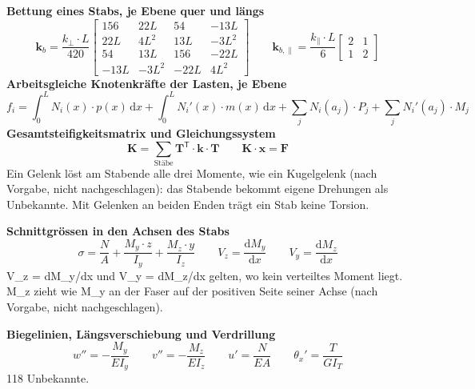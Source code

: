 \documentclass[11pt,a4paper]{article}
\begin{document}
\noindent\textbf{Bettung eines Stabs, je Ebene quer und längs}
\begin{equation*}
\mathbf{k}_{b} = \frac{k_{\perp} \cdot L}{420} \begin{bmatrix} 156 & 22L & 54 & -13L \\ 22L & 4L^2 & 13L & -3L^2 \\ 54 & 13L & 156 & -22L \\ -13L & -3L^2 & -22L & 4L^2 \end{bmatrix} \qquad \mathbf{k}_{b,\parallel} = \frac{k_{\parallel} \cdot L}{6} \begin{bmatrix} 2 & 1 \\ 1 & 2 \end{bmatrix}
\end{equation*}
\noindent\textbf{Arbeitsgleiche Knotenkräfte der Lasten, je Ebene}
\begin{equation*}
f_i = \int_0^L N_i(x) \cdot p(x)\,\mathrm{d}x + \int_0^L N_i'(x) \cdot m(x)\,\mathrm{d}x + \sum_j N_i(a_j) \cdot P_j + \sum_j N_i'(a_j) \cdot M_j
\end{equation*}
\noindent\textbf{Gesamtsteifigkeitsmatrix und Gleichungssystem}
\begin{equation*}
\mathbf{K} = \sum_{\text{Stäbe}} \mathbf{T}^{\mathsf{T}} \cdot \mathbf{k} \cdot \mathbf{T} \qquad \mathbf{K} \cdot \mathbf{x} = \mathbf{F}
\end{equation*}
Ein Gelenk löst am Stabende alle drei Momente, wie ein Kugelgelenk (nach Vorgabe, nicht nachgeschlagen): das Stabende bekommt eigene Drehungen als Unbekannte. Mit Gelenken an beiden Enden trägt ein Stab keine Torsion.

\noindent\textbf{Schnittgrössen in den Achsen des Stabs}
\begin{equation*}
\sigma = \frac{N}{A} + \frac{M_y \cdot z}{I_y} + \frac{M_z \cdot y}{I_z} \qquad V_z = \frac{\mathrm{d}M_y}{\mathrm{d}x} \qquad V_y = \frac{\mathrm{d}M_z}{\mathrm{d}x}
\end{equation*}
V\_z = dM\_y/dx und V\_y = dM\_z/dx gelten, wo kein verteiltes Moment liegt. M\_z zieht wie M\_y an der Faser auf der positiven Seite seiner Achse (nach Vorgabe, nicht nachgeschlagen).

\noindent\textbf{Biegelinien, Längsverschiebung und Verdrillung}
\begin{equation*}
w'' = -\frac{M_y}{EI_y} \qquad v'' = -\frac{M_z}{EI_z} \qquad u' = \frac{N}{EA} \qquad \theta_x' = \frac{T}{GI_T}
\end{equation*}
118 Unbekannte.
\end{document}

